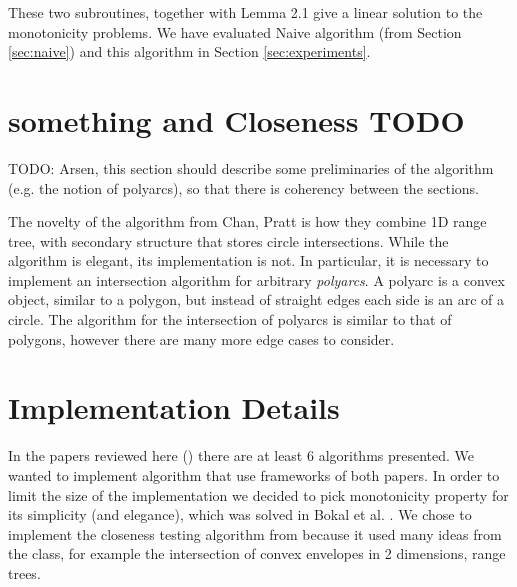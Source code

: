 \documentclass{article}
\begin{document}
These two subroutines, together with Lemma 2.1 give a linear solution
to the monotonicity problems. We have evaluated Naive algorithm
(from Section \ref{sec:naive}) and this algorithm in Section
\ref{sec:experiments}.



\section{something and Closeness TODO}
\label{sec:closeness}
TODO: Arsen, this section should describe some preliminaries of the algorithm (e.g. the notion of polyarcs), so that there is coherency between the sections.

The novelty of the algorithm from Chan, Pratt is how they combine 1D range tree, with secondary structure that stores circle intersections. While the algorithm is elegant, its implementation is not. In particular, it is necessary to implement an intersection algorithm for arbitrary \textit{polyarcs}. A polyarc is a convex object, similar to a polygon, but instead of straight edges each side is an arc of a circle. The algorithm for the intersection of polyarcs is similar to that of polygons, however there are many more edge cases to consider.

\section{Implementation Details}
\label{sec:implementation}
In the papers reviewed here (\cite{bokal2015,chan2016}) there are at least 6 algorithms presented. We wanted to implement algorithm that use frameworks of both papers. In order to limit the size of the implementation we decided to pick monotonicity property for its simplicity (and elegance), which was solved in Bokal et al. \cite{bokal2015}. We chose to implement the closeness testing algorithm from \cite{chan2016} because it used many ideas from the class, for example the intersection of convex envelopes in 2 dimensions, range trees.
\end{document}
